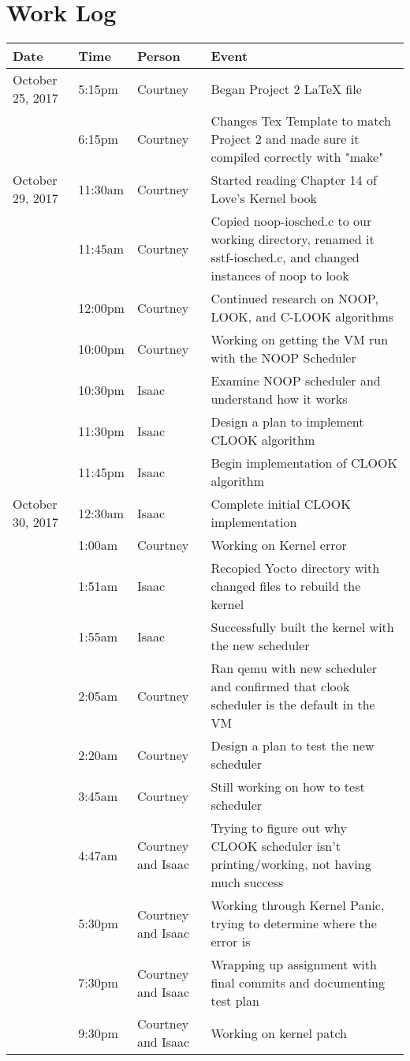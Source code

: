 \documentclass[letterpaper,10pt,draftclsnofoot,onecolumn,titlepage]{IEEEtran}
\begin{document}
\section{Work Log}
\begin{center}
\begin{tabular}{p{3cm}p{1cm}p{1cm}p{10cm} }
 Date  & Time & Person & Event \\ \hline
October 25, 2017 & 5:15pm & Courtney & Began Project 2 LaTeX file \\
		 & 6:15pm & Courtney & Changes Tex Template to match Project 2 and made sure it compiled correctly with "make" \\
October 29, 2017 & 11:30am & Courtney & Started reading Chapter 14 of Love's Kernel book \\                 
		 & 11:45am & Courtney & Copied noop-iosched.c to our working directory, renamed it sstf-iosched.c, and changed instances of noop to look \\ 
		 & 12:00pm & Courtney & Continued research on NOOP, LOOK, and C-LOOK algorithms \\
		 & 10:00pm & Courtney & Working on getting the VM run with the NOOP Scheduler \\
   		 & 10:30pm & Isaac & Examine NOOP scheduler and understand how it works \\
   		 & 11:30pm & Isaac & Design a plan to implement CLOOK algorithm \\
   		 & 11:45pm & Isaac & Begin implementation of CLOOK algorithm \\
October 30, 2017 & 12:30am & Isaac & Complete initial CLOOK implementation \\
		 & 1:00am & Courtney & Working on Kernel error \\
		 & 1:51am & Isaac & Recopied Yocto directory with changed files to rebuild the kernel \\
		 & 1:55am & Isaac & Successfully built the kernel with the new scheduler \\
		 & 2:05am & Courtney & Ran qemu with new scheduler and confirmed that clook scheduler is the default in the VM \\
   		 & 2:20am & Courtney & Design a plan to test the new scheduler \\
		 & 3:45am & Courtney & Still working on how to test scheduler \\
		 & 4:47am & Courtney and Isaac & Trying to figure out why CLOOK scheduler isn't printing/working, not having much success \\
		 & 5:30pm & Courtney and Isaac & Working through Kernel Panic, trying to determine where the error is \\
   		 & 7:30pm & Courtney and Isaac & Wrapping up assignment with final commits and documenting test plan \\
		 & 9:30pm & Courtney and Isaac & Working on kernel patch \\
\end{tabular}
\end{center}
\end{document}
